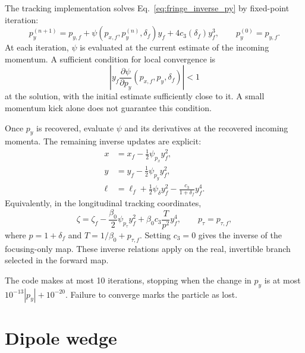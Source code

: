 The tracking implementation solves Eq.~\eqref{eq:fringe_inverse_py}
by fixed-point iteration:
\begin{equation}
 p_y^{(n+1)}=p_{y,f}
 +\psi(p_{x,f},p_y^{(n)},\delta_f)y_f
 +4c_3(\delta_f)y_f^3,
 \qquad p_y^{(0)}=p_{y,f}.
\end{equation}
At each iteration, $\psi$ is evaluated at the current estimate of the
incoming momentum. A sufficient condition for local convergence is
\begin{equation}
 \left|y_f\frac{\partial\psi}{\partial p_y}
       (p_{x,f},p_y,\delta_f)\right|<1
\end{equation}
at the solution, with the initial estimate sufficiently close to it.
A small momentum kick alone does not guarantee this condition.

Once $p_y$ is recovered, evaluate $\psi$ and its derivatives at the
recovered incoming momenta. The remaining inverse updates are explicit:
\begin{align}
 x&=x_f-\frac12\psi_{p_x}y_f^2,\\
 y&=y_f-\frac12\psi_{p_y}y_f^2,\\
 \ell&=\ell_f+\frac12\psi_\delta y_f^2
                   -\frac{c_3}{1+\delta_f}y_f^4.
\end{align}
Equivalently, in the longitudinal tracking coordinates,
\begin{equation}
 \zeta=\zeta_f-\frac{\beta_0}{2}\psi_{p_\tau}y_f^2
                 +\beta_0c_3\frac{T}{p^2}y_f^4,
 \qquad p_\tau=p_{\tau,f},
\end{equation}
where $p=1+\delta_f$ and $T=1/\beta_0+p_{\tau,f}$.
Setting $c_3=0$ gives the inverse of the focusing-only map.
These inverse relations apply on the real, invertible branch selected
in the forward map.

The code makes at most 10 iterations, stopping when the change in $p_y$ is
at most $10^{-13}|p_y|+10^{-20}$. Failure to converge marks the particle
as lost.


\section{Dipole wedge} \label{sec:DipoleWedge}

